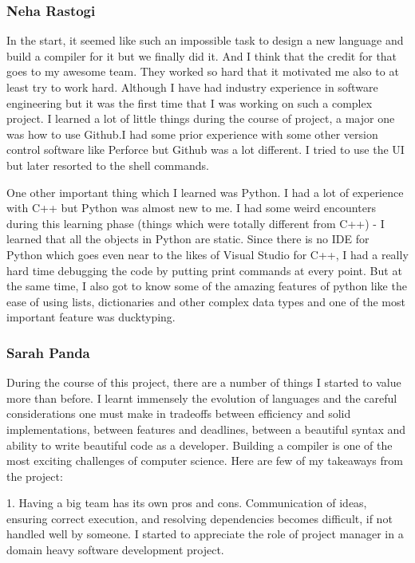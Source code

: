 \documentclass[a4paper]{article}
\begin{document}
\subsubsection{Neha Rastogi}
In the start, it seemed like such an impossible task to design a new language and build a compiler for it but we finally did it.
And I think that the credit for that goes to my awesome team. They worked so hard that it motivated me also to at least try to work hard.
Although I have had industry experience in software engineering but it was the first time that I was working on such a complex project. I learned a lot of little things during the course of project, a major one was how to use Github.I had some prior experience with some other version control software like Perforce but Github was a lot different. I tried to use the UI but later resorted to the shell commands.

One other important thing which I learned was Python. I had a lot of experience with C++ but Python was almost new to me. I had some weird encounters during this learning phase (things which were totally different from C++) - I learned that all the objects in Python are static. Since there is no IDE for Python which goes even near to the likes of Visual Studio for C++, I had a really hard time debugging the code by putting print commands at every point. But at the same time, I also got to know some of the amazing features of python like the ease of using lists, dictionaries and other complex data types and one of the most important feature was ducktyping.

\subsubsection{Sarah Panda}
During the course of this project, there are a number of things I started to value more than before. I learnt immensely the evolution of languages and the careful considerations one must make in tradeoffs between efficiency and solid implementations, between features and deadlines, between a beautiful syntax and ability to write beautiful code as a developer. Building a compiler is one of the most exciting challenges of computer science. Here are few of my takeaways from the project:

1. Having a big team has its own pros and cons.  Communication of ideas, ensuring correct execution, and resolving dependencies becomes difficult, if not handled well by someone.  I started to appreciate the role of project manager in a domain heavy software development project.
\end{document}
